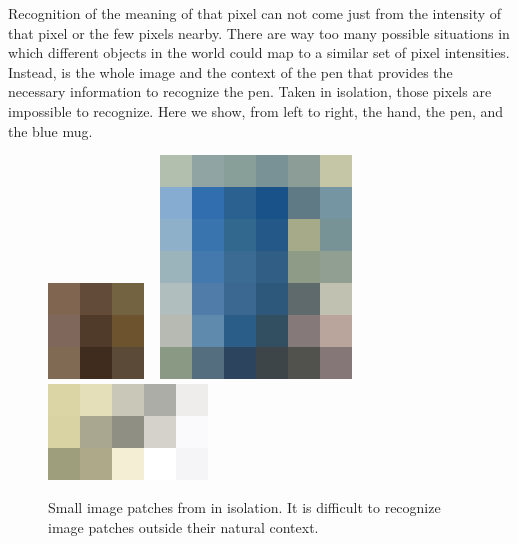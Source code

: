 Recognition of the meaning of that pixel can not come just from the intensity of that pixel or the few pixels nearby. There are way too many possible situations in which different objects in the world could map to a similar set of pixel intensities. Instead, is the whole image and the context of the pen that provides the necessary information to recognize the pen. Taken in isolation, those pixels are impossible to recognize. Here we show, from left to right, the hand, the pen, and the blue mug.


\begin{figure}[h!]
\centerline{
    \includegraphics[width=.17\linewidth]{figures/visionscience/dalle_hand.png}
    ~
    \includegraphics[width=.34\linewidth]{figures/visionscience/dalle_mug.png}
    ~
    \includegraphics[width=.29\linewidth]{figures/visionscience/dalle_pen.png}
    }
    \caption{Small image patches from \fig{\ref{fig:pexels-retha-ferguson}} in isolation. It is difficult to recognize image patches outside their natural context.}
\end{figure}





